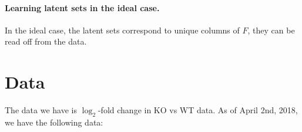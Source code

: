 \documentclass{article}
\begin{document}
\paragraph{Learning latent sets in the ideal case.}
In the ideal case, the latent sets correspond to unique columns of $F$, they can be read off from the data.

\section{Data}

The data we have is $\log_2$-fold change in KO vs WT data.
As of April 2nd, 2018, we have the following data:




\printbibliography
\end{document}
